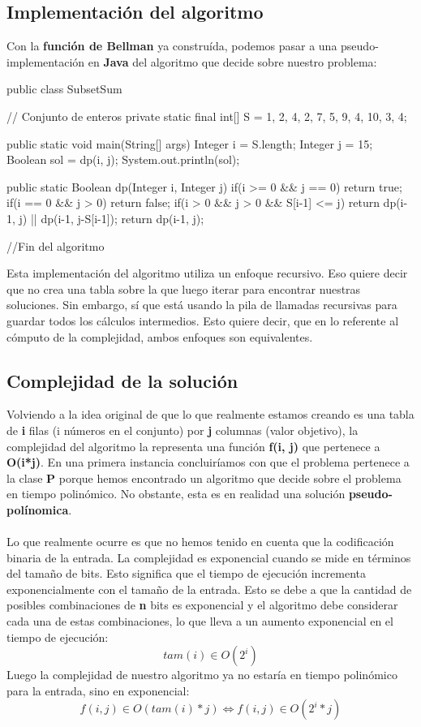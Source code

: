 \documentclass[../main]{subfiles}
\begin{document}
\subsection{Implementación del algoritmo}
Con la \textbf{función de Bellman} ya construída, podemos pasar a una pseudo-implementación en \textbf{Java} del algoritmo que decide sobre nuestro problema:
\begin{javacode}
public class SubsetSum {
    // Conjunto de enteros
    private static final int[] S = {1, 2, 4, 2, 7, 5, 9, 4, 10, 3, 4};

    public static void main(String[] args) {
        Integer i = S.length;
        Integer j = 15;
        Boolean sol = dp(i, j);
        System.out.println(sol);
    }

    public static Boolean dp(Integer i, Integer j) {
        if(i >= 0 && j == 0) return true;
        if(i == 0 && j > 0) return false;
        if(i > 0 && j > 0 && S[i-1] <= j) {
            return dp(i-1, j) || dp(i-1, j-S[i-1]);
        }
        return dp(i-1, j);
    }
}
//Fin del algoritmo
\end{javacode}
Esta implementación del algoritmo utiliza un enfoque recursivo. Eso quiere decir que no crea una tabla sobre la que luego iterar para encontrar nuestras soluciones. Sin embargo, sí que está usando la pila de llamadas recursivas para guardar todos los cálculos intermedios. Esto quiere decir, que en lo referente al cómputo de la complejidad, ambos enfoques son equivalentes.

\subsection{Complejidad de la solución}
Volviendo a la idea original de que lo que realmente estamos creando es una tabla de \textbf{i} filas (i números en el conjunto) por \textbf{j} columnas (valor objetivo), la complejidad del algoritmo la representa una función \textbf{f(i, j)} que pertenece a \textbf{O(i*j)}. En una primera instancia concluiríamos con que el problema pertenece a la clase \textbf{P} porque hemos encontrado un algoritmo que decide sobre el problema en tiempo polinómico. No obstante, esta es en realidad una solución \textbf{pseudo-polínomica}.
\\\\
Lo que realmente ocurre es que no hemos tenido en cuenta que la codificación binaria de la entrada. La complejidad es exponencial cuando se mide en términos del tamaño de bits. Esto significa que el tiempo de ejecución incrementa exponencialmente con el tamaño de la entrada. Esto se debe a que la cantidad de posibles combinaciones de \textbf{n} bits es exponencial y el algoritmo debe considerar cada una de estas combinaciones, lo que lleva a un aumento exponencial en el tiempo de ejecución:
\begin{equation*}
    tam(i) \in O(2^i)
\end{equation*}
Luego la complejidad de nuestro algoritmo ya no estaría en tiempo polinómico para la entrada, sino en exponencial:
\begin{equation*}
    f(i, j) \in O(tam(i)*j) \Leftrightarrow  f(i, j) \in O(2^i*j)
\end{equation*}
\end{document}
